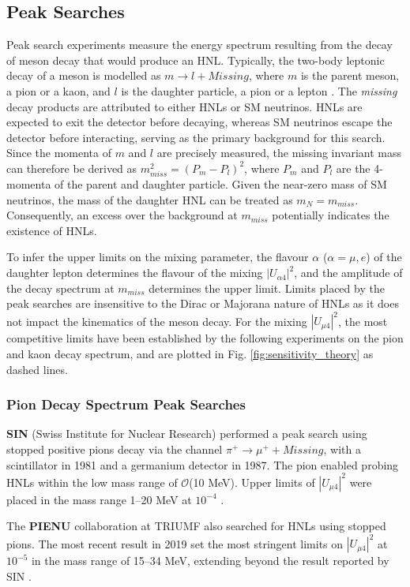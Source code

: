 \subsection{Peak Searches}
\label{sec:peaksearch}

Peak search experiments measure the energy spectrum  resulting from the decay of meson decay that would produce an HNL. 
Typically, the two-body leptonic decay of a meson is modelled as $m\rightarrow l + Missing$, where $m$ is the parent meson, a pion or a kaon, and $l$ is the daughter particle, a pion or a lepton \cite{OwenPhD}.
The \textit{missing} decay products are attributed to either HNLs or SM neutrinos.
HNLs are expected to exit the detector before decaying, whereas SM neutrinos escape the detector before interacting, serving as the primary background for this search.
Since the momenta of $m$ and $l$ are precisely measured, the missing invariant mass can therefore be derived as $m^{2}_{miss} = (P_{m} - P_{l})^{2}$, where $P_{m}$ and $P_{l}$ are the 4-momenta of the parent and daughter particle.
Given the near-zero mass of SM neutrinos, the mass of the daughter HNL can be treated as $m_{N} = m_{miss}$.
Consequently, an excess over the background at $m_{miss}$ potentially indicates the existence of HNLs.

To infer the upper limits on the mixing parameter, the flavour $\alpha$ ($\alpha =\mu,e$) of the daughter lepton determines the flavour of the mixing $|U_{\alpha4}|^2$, and the amplitude of the decay spectrum at $m_{miss}$ determines the upper limit.
Limits placed by the peak searches are insensitive to the Dirac or Majorana nature of HNLs as it does not impact the kinematics of the meson decay.
For the mixing $|U_{\mu4}|^{2}$, the most competitive limits have been established by the following experiments on the pion and kaon decay spectrum, and are plotted in Fig. \ref{fig:sensitivity_theory} as dashed lines.

\subsubsection{Pion Decay Spectrum Peak Searches}

\begin{coloritemize}
\item \textbf{SIN} (Swiss Institute for Nuclear Research) performed a peak search using stopped positive pions decay via the channel $\pi^{+} \rightarrow \mu^{+} + Missing$, with a scintillator in 1981 and a germanium detector in 1987.
The pion enabled probing HNLs within the low mass range of $\mathcal{O}$(10 MeV).
Upper limits of $|U_{\mu4}|^{2}$ were placed in the mass range 1--20 MeV at $10^{-4}$ \cite{SIN1, SIN2, SIN3}.

\item The \textbf{PIENU} collaboration at TRIUMF also searched for HNLs using stopped pions.
The most recent result in 2019 set the most stringent limits on $|U_{\mu4}|^{2}$ at $10^{-5}$ in the mass range of 15--34 MeV, extending beyond the result reported by SIN \cite{PIENU}.

\end{coloritemize}

